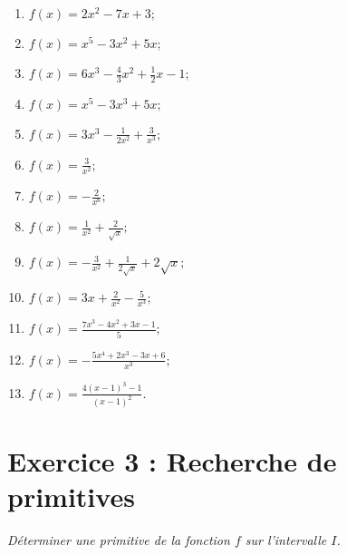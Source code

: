 \documentclass[12pt]{article}
\begin{document}
\begin{enumerate}
    \item $f(x) = 2x^2 -7x + 3;$
    \item $f(x) = x^5 - 3x^2 + 5x;$
    \item $f(x) = 6x^3 - \frac{4}{3}x^2 + \frac{1}{2}x-1;$
    \item $f(x) = x^5 -3x^{3}+ 5x;$
    \item $f(x) = 3x^{3}-\frac{1}{2x^2} + \frac{3}{x^3};$
    \item $f(x) = \frac{3}{x^2};$
    \item $f(x) = -\frac{2}{x^6};$
    \item $f(x) = \frac{1}{x^2} + \frac{2}{\sqrt{x}};$
    \item $f(x) = -\frac{3}{x^2} + \frac{1}{2\sqrt{x}} + 2\sqrt{x};$
    \item $f(x) = 3x + \frac{2}{x^2} - \frac{5}{x^3};$
    \item $f(x) = \frac{7x^3 - 4x^2 + 3x - 1}{5};$
    \item $f(x) = -\frac{5x^4 + 2x^3 - 3x + 6}{x^3};$
    \item $f(x)=\frac{4(x-1)^{3}-1}{(x-1)^{2}}.$
\end{enumerate}

\section*{Exercice 3 : Recherche de primitives}

\textit{Déterminer une primitive de la fonction $f$ sur l’intervalle $I$.}
\end{document}
